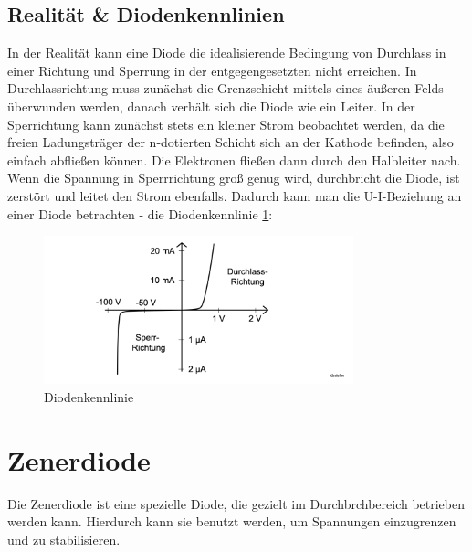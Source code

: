 \documentclass{article}
\theoremstyle{definition}
\begin{document}
    \subsection{Realität \& Diodenkennlinien}
    In der Realität kann eine Diode die idealisierende Bedingung von Durchlass in einer Richtung und Sperrung 
    in der entgegengesetzten nicht erreichen. In Durchlassrichtung muss zunächst die Grenzschicht mittels eines 
    äußeren Felds überwunden werden, danach verhält sich die Diode wie ein Leiter. In der Sperrichtung kann zunächst stets 
    ein kleiner Strom beobachtet werden, da die freien Ladungsträger der n-dotierten Schicht sich an der Kathode befinden, also einfach 
    abfließen können. Die Elektronen fließen dann durch den Halbleiter nach. Wenn die Spannung in Sperrrichtung groß genug wird, durchbricht 
    die Diode, ist zerstört und leitet den Strom ebenfalls. Dadurch kann man die U-I-Beziehung an einer Diode betrachten - die Diodenkennlinie \ref{fig:Abb2.2}:
    \begin{figure}[H]
        \centering
        \includegraphics[width=0.8\textwidth]{figs/fig2_2.png}
        \caption{Diodenkennlinie\cite{anleitung}}
        \label{fig:Abb2.2}
    \end{figure}

\section{Zenerdiode}

Die Zenerdiode ist eine spezielle Diode, die gezielt im Durchbrchbereich betrieben werden kann. 
Hierdurch kann sie benutzt werden, um Spannungen einzugrenzen und zu stabilisieren. 
\end{document}
